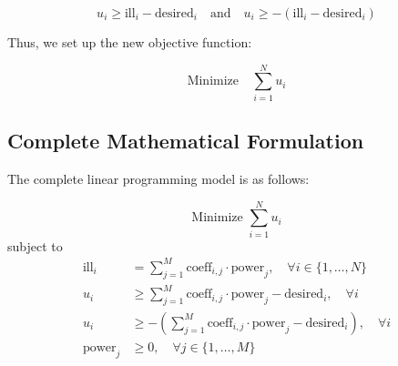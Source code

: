 \documentclass{article}
\begin{document}
\[
u_i \geq \text{ill}_i - \text{desired}_i \quad \text{and} \quad u_i \geq -(\text{ill}_i - \text{desired}_i) 
\]

Thus, we set up the new objective function:

\[
\text{Minimize} \quad \sum_{i=1}^{N} u_i
\]

\subsection*{Complete Mathematical Formulation}

The complete linear programming model is as follows:

\[
\text{Minimize } \sum_{i=1}^{N} u_i
\]
subject to
\[
\begin{align*}
\text{ill}_i & = \sum_{j=1}^{M} \text{coeff}_{i,j} \cdot \text{power}_j, \quad \forall i \in \{1, \ldots, N \} \\
u_i & \geq \sum_{j=1}^{M} \text{coeff}_{i,j} \cdot \text{power}_j - \text{desired}_i, \quad \forall i \\
u_i & \geq -(\sum_{j=1}^{M} \text{coeff}_{i,j} \cdot \text{power}_j - \text{desired}_i), \quad \forall i \\
\text{power}_j & \geq 0, \quad \forall j \in \{1, \ldots, M\}
\end{align*}
\]
\end{document}
